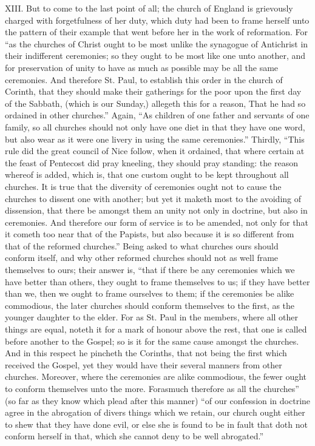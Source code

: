XIII. But to come to the last point of all; the church of England is grievously charged with forgetfulness of her duty, which duty had been to frame herself unto the pattern of their example that went before her in the work of reformation. For “as the churches of Christ ought to be most unlike the synagogue of Antichrist in their indifferent ceremonies; so they ought to be most like one unto another, and for preservation of unity to have as much as possible may be all the same ceremonies. And therefore St. Paul, to establish this order in the church of Corinth, that they should make their gatherings for the poor upon the first day of the Sabbath, (which is our Sunday,) allegeth this for a reason, That he had so ordained in other churches.” Again, “As children of one father and servants of one family, so all churches should not only have one diet in that they have one word, but also wear as it were one livery in using the same ceremonies.” Thirdly, “This rule did the great council of Nice follow, when it ordained, that where certain at the feast of Pentecost did pray kneeling, they should pray standing: the reason whereof is added, which is, that one custom ought to be kept throughout all churches. It is true that the diversity of ceremonies ought not to cause the churches to dissent one with another; but yet it maketh most to the avoiding of dissension, that there be amongst them an unity not only in doctrine, but also in ceremonies. And therefore our form of service is to be amended, not only for that it cometh too near that of the  Papists, but also because it is so different from that of the reformed churches.” Being asked to what churches ours should conform itself, and why other reformed churches should not as well frame themselves to ours; their answer is, “that if there be any ceremonies which we have better than others, they ought to frame themselves to us; if they have better than we, then we ought to frame ourselves to them; if the ceremonies be alike commodious, the later churches should conform themselves to the first, as the younger daughter to the elder. For as St. Paul in the members, where all other things are equal, noteth it for a mark of honour above the rest, that one is called before another to the Gospel; so is it for the same cause amongst the churches. And in this respect he pincheth the Corinths, that not being the first which received the Gospel, yet they would have their several manners from other churches. Moreover, where the ceremonies are alike commodious, the fewer ought to conform themselves unto the more. Forasmuch therefore as all the churches” (so far as they know which plead after this manner) “of our confession in doctrine agree in the abrogation of divers things which we retain, our church ought either to shew that they have done evil, or else she is found to be in fault that doth not conform herself in that, which she cannot deny to be well abrogated.”

